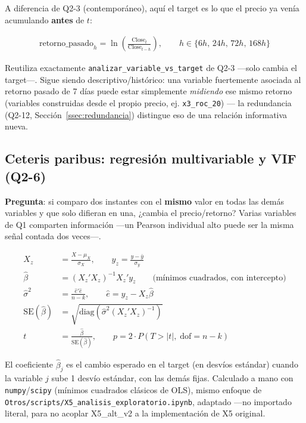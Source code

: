 \documentclass[11pt,a4paper]{article}
\newcommand{\code}[1]{\texttt{\small #1}}
\begin{document}
A diferencia de Q2-3 (contemporáneo), aquí el target es lo que el precio ya venía
acumulando \textbf{antes} de \(t\):

\begin{align}
\text{retorno\_pasado}_h = \ln\!\left(\frac{\text{Close}_t}{\text{Close}_{t-h}}\right),
  \qquad h \in \{6h,\, 24h,\, 72h,\, 168h\}
\end{align}

Reutiliza exactamente \code{analizar\_variable\_vs\_target} de Q2-3 —solo cambia el
target—. Sigue siendo descriptivo/histórico: una variable fuertemente asociada al retorno
pasado de 7 días puede estar simplemente \emph{midiendo} ese mismo retorno (variables
construidas desde el propio precio, ej. \code{x3\_roc\_20}) — la redundancia (Q2-12,
Sección~\ref{ssec:redundancia}) distingue eso de una relación informativa nueva.

\subsection{Ceteris paribus: regresión multivariable y VIF (Q2-6)}

\textbf{Pregunta}: si comparo dos instantes con el \textbf{mismo} valor en todas las demás
variables y que solo difieran en una, ¿cambia el precio/retorno? Varias variables de Q1
comparten información —un Pearson individual alto puede ser la misma señal contada dos
veces—.

\begin{align}
X_z &= \frac{X - \mu_X}{\sigma_X}, \qquad y_z = \frac{y - \bar{y}}{\sigma_y} \\
\hat{\beta} &= (X_z'X_z)^{-1}X_z'y_z \qquad \text{(mínimos cuadrados, con intercepto)} \\
\hat{\sigma}^2 &= \frac{\hat{e}'\hat{e}}{n-k}, \qquad \hat{e} = y_z - X_z\hat{\beta} \\
\mathrm{SE}(\hat\beta) &= \sqrt{\mathrm{diag}\!\left(\hat\sigma^2 (X_z'X_z)^{-1}\right)} \\
t &= \frac{\hat\beta}{\mathrm{SE}(\hat\beta)}, \qquad p = 2\cdot P(T > |t|,\; \mathrm{dof}=n-k)
\end{align}

El coeficiente \(\hat\beta_j\) es el cambio esperado en el target (en desvíos estándar)
cuando la variable \(j\) sube 1 desvío estándar, con las demás fijas. Calculado a mano con
\code{numpy}/\code{scipy} (mínimos cuadrados clásicos de OLS), mismo enfoque de
\code{Otros/scripts/X5\_analisis\_exploratorio.ipynb}, adaptado —no importado literal, para
no acoplar X5\_alt\_v2 a la implementación de X5 original.
\end{document}

